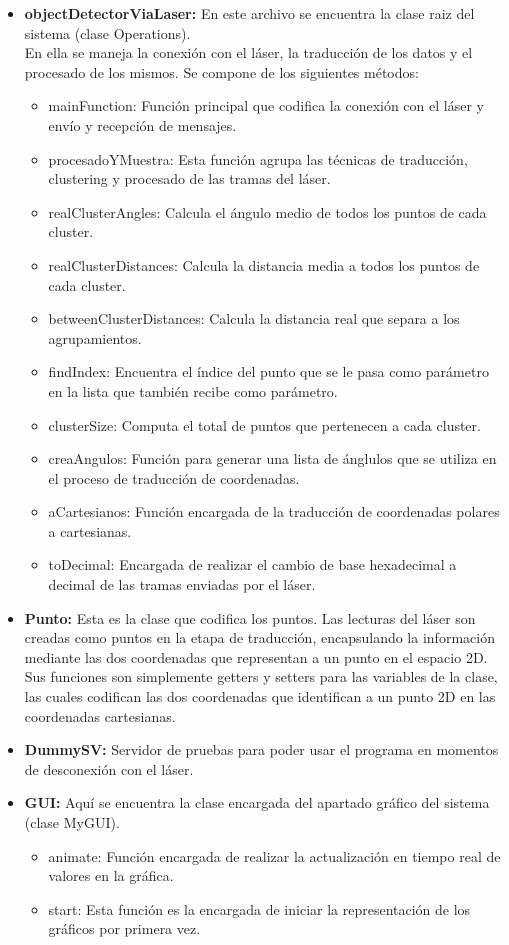 \begin{itemize}
\item \textbf{objectDetectorViaLaser:} En este archivo se encuentra la clase raiz del sistema (clase Operations).\\ En ella se maneja la conexión con el láser, la traducción de los datos y el procesado de los mismos. Se compone de los siguientes métodos: 
\begin{itemize}
\item mainFunction: Función principal que codifica la conexión con el láser y envío y recepción de mensajes.
\item procesadoYMuestra: Esta función agrupa las técnicas de traducción, clustering y procesado de las tramas del láser.
\item realClusterAngles: Calcula el ángulo medio de todos los puntos de cada cluster.
\item realClusterDistances: Calcula la distancia media a todos los puntos de cada cluster.
\item betweenClusterDistances: Calcula la distancia real que separa a los agrupamientos.
\item findIndex: Encuentra el índice del punto que se le pasa como parámetro en la lista que también recibe como parámetro.
\item clusterSize: Computa el total de puntos que pertenecen a cada cluster.
\item creaAngulos: Función para generar una lista de ánglulos que se utiliza en el proceso de traducción de coordenadas.
\item aCartesianos: Función encargada de la traducción de coordenadas polares a cartesianas.
\item toDecimal: Encargada de realizar el cambio de base hexadecimal a decimal de las tramas enviadas por el láser.
\end{itemize}
\item \textbf{Punto:} Esta es la clase que codifica los puntos. Las lecturas del láser son creadas como puntos en la etapa de traducción, encapsulando la información mediante las dos coordenadas que representan a un punto en el espacio 2D. Sus funciones son simplemente getters y setters para las variables de la clase, las cuales codifican las dos coordenadas que identifican a un punto 2D en las coordenadas cartesianas.

\item \textbf{DummySV:} Servidor de pruebas para poder usar el programa en momentos de desconexión con el láser.
\item \textbf{GUI:} Aquí se encuentra la clase encargada del apartado gráfico del sistema (clase MyGUI). 
\begin{itemize}
\item animate: Función encargada de realizar la actualización en tiempo real de valores en la gráfica.
\item start: Esta función es la encargada de iniciar la representación de los gráficos por primera vez.
\end{itemize}
\end{itemize}
